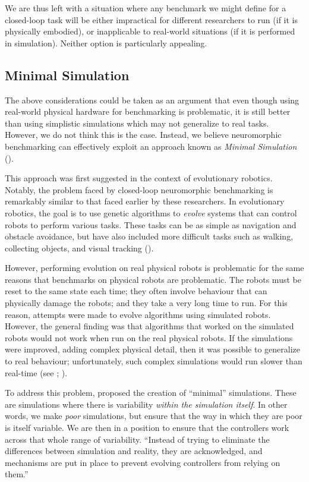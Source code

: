 \documentclass{frontiersSCNS} %
\begin{document}
We are thus left with a situation where any benchmark we might define for
a closed-loop task will be either impractical for different researchers to
run (if it is physically embodied), or inapplicable to real-world situations
(if it is performed in simulation).  Neither option is particularly appealing.

\subsection{Minimal Simulation}

The above considerations could be taken as an argument that even though using real-world
physical hardware for benchmarking is problematic, it is still better than
using simplistic simulations which may not generalize to real tasks.  However,
we do not think this is the case.  Instead, we believe neuromorphic benchmarking can effectively exploit an approach 
known as \emph{Minimal Simulation}
(\citealt{Jakobi97evolutionaryrobotics}).

This approach was first suggested in the context of evolutionary robotics.  
Notably, the problem faced by closed-loop neuromorphic benchmarking is remarkably 
similar to that faced earlier by these researchers. 
In evolutionary robotics, the
goal is to use genetic algorithms to \emph{evolve} systems that can control
robots to perform various tasks.  These tasks can be as simple as navigation
and obstacle avoidance, but have also included more difficult tasks such as walking,
collecting objects, and visual tracking (\citealt{Nolfi2000}).

However, performing evolution on real physical robots is problematic
for the same reasons that benchmarks on physical robots are problematic.  The
robots must be reset to the same state each time; they often involve
behaviour that can physically damage the robots; and they take a very long
time to run.  For this reason, attempts were made to evolve algorithms using simulated
robots.  However, the general finding was that algorithms that worked on the
simulated robots would not work when run on the real physical robots.  If
the simulations were improved, adding complex physical detail, then it was
possible to generalize to real behaviour; unfortunately, such complex
simulations would run slower than real-time (see \citealt{Husbands1992}; 
\citealt{Husbands1993}).

To address this problem, \cite{Jakobi97evolutionaryrobotics} proposed the creation of
``minimal'' simulations.  These are simulations where there is variability
\emph{within the simulation itself}.  In other words, we make \emph{poor}
simulations, but ensure that the way in which they are poor is itself
variable.  We are then in a position to ensure that the controllers work across that whole
range of variability.  ``Instead of trying to eliminate the differences between
simulation and reality, they are acknowledged, and mechanisms are put in place
to prevent evolving controllers from relying on them.'' \citep[p.~48]{jakobiThesis}
\end{document}
